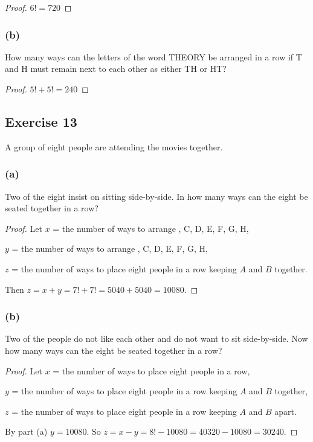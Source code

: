 \documentclass[14pt]{extarticle}
\begin{document}
\begin{proof}
     \(6! = 720\)
\end{proof}

\subsubsection{(b)}
How many ways can the letters of the word THEORY be arranged in a row if T and H must remain next to each other
as either TH or HT?

\begin{proof}
     \(5! + 5! = 240\)
\end{proof}

\subsection{Exercise 13}
A group of eight people are attending the movies together.

\subsubsection{(a)}
Two of the eight insist on sitting side-by-side. In how many ways can the eight be seated together in a row?

\begin{proof}
     Let $x$ = the number of ways to arrange , C, D, E, F, G, H,

     $y$ = the number of ways to arrange , C, D, E, F, G, H,

     $z$ = the number of ways to place eight people in a row keeping $A$ and $B$ together.

     Then \(z = x+y = 7!+7! = 5040+5040 = 10080\).
\end{proof}

\subsubsection{(b)}
Two of the people do not like each other and do not want to sit side-by-side. Now how many ways can the eight be seated
together in a row?

\begin{proof}
     Let $x$ = the number of ways to place eight people in a row,

     $y$ = the number of ways to place eight people in a row keeping $A$ and $B$ together,

     $z$ = the number of ways to place eight people in a row keeping $A$ and $B$ apart.

     By part (a) $y = 10080$. So \(z = x-y = 8!-10080 = 40320-10080 = 30240\).
\end{proof}
\end{document}
